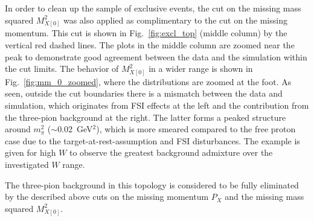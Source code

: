 In order to clean up the sample of exclusive events, the cut on the missing mass squared $M^{2}_{X[0]}$ was also applied as complimentary to the cut on the missing momentum. This cut is shown in Fig.~\ref{fig:excl_top} (middle column) by the vertical red dashed lines. The plots in the middle column are zoomed near the peak to demonstrate good agreement between the data and the simulation within the cut limits. The behavior of $M^{2}_{X[0]}$ in a wider range is shown in Fig.~\ref{fig:mm_0_zoomed}, where the distributions are zoomed at the foot. As seen, outside the cut boundaries there is a mismatch between the data and simulation, which originates from FSI effects at the left and the contribution from the three-pion background at the right. The latter forms a peaked structure around $m_{\pi}^{2}$ ($\sim$0.02~GeV$^{2}$), which is more smeared compared to the free proton case due to the target-at-rest-assumption and FSI disturbances. The example is given for high $W$ to observe the greatest background admixture over the investigated $W$ range.

The three-pion background in this topology is considered to be fully eliminated by the described above cuts on the missing momentum $P_{X}$ and the missing mass squared $M^{2}_{X[0]}$.



